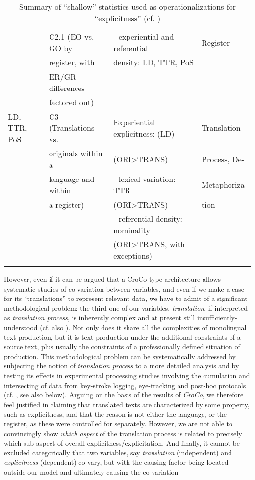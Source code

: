 \documentclass[output=paper]{LSP/langsci}
\begin{document}
\begin{table}
{\begin{tabular}{llll}
{} & C2.1 (EO vs. GO by & - experiential and referential & Register\\
{} & register, with & density: LD, TTR, PoS & {}\\
{} & ER/GR differences & {} & {}\\
{} & factored out) & {} & {}\\
\tablevspace\tablevspace
LD, TTR, PoS & C3 (Translations vs.& Experiential explicitness: (LD) & Translation\\
{} & originals within a & (ORI{\textgreater}TRANS) & Process, De-\\
{} & language and within & - lexical variation: TTR & Metaphoriza-\\
{} & a register) & (ORI{\textgreater}TRANS) & tion\\
{} & {} & - referential density: nominality & {}\\ 
{} & {} & (ORI{\textgreater}TRANS, with exceptions) & {}\\ 
\lspbottomrule
\end{tabular}
}
\caption{Summary of ``shallow'' statistics used as operationalizations for ``explicitness'' (cf. \citealt[ch.14]{Hansen-SchirraEtAlfc})}
\label{tab:steiner:SummaryOfShallowStatistics}
\end{table}

However, even if it can be argued that a CroCo-type architecture allows systematic studies of co-variation between variables, and even if we make a case for its ``translations'' to represent relevant data, we have to admit of a significant methodological problem: the third one of our variables, \textit{translation}, if interpreted as \textit{translation process}, is inherently complex and at present still insufficiently-understood (cf. also \citealt{Becher2010}). Not only does it share all the complexities of monolingual text production, but it is text production under the additional constraints of a source text, plus usually the constraints of a professionally defined situation of production. This methodological problem can be systematically addressed by subjecting the notion of \textit{translation process} to a more detailed analysis and by testing its effects in experimental processing studies involving the cumulation and intersecting of data from key-stroke logging, eye-tracking and post-hoc protocols (cf. \citealt{AlvesEtAl2010}, see also  below). Arguing on the basis of the results of \textit{CroCo}, we therefore feel justified in claiming that translated texts are characterized by some property, such as explicitness, and that the reason is not either the language, or the register, as these were controlled for separately. However, we are not able to convincingly show \textit{which aspect} of the translation process is related to precisely which sub-aspect of overall explicitness/explicitation. And finally, it cannot be excluded categorically that two variables, say \textit{translation} (independent) and \textit{explicitness} (dependent) co-vary, but with the causing factor being located outside our model and ultimately causing the co-variation. 
\end{document}
